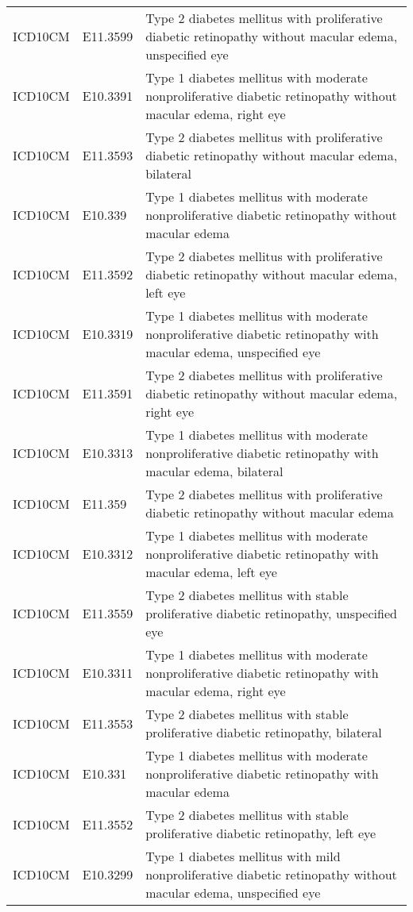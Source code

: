 \begin{table}[ht]
\begin{tabular}{lll}
  ICD10CM & E11.3599 & Type 2 diabetes mellitus with proliferative diabetic retinopathy without macular edema, unspecified eye \\ 
  ICD10CM & E10.3391 & Type 1 diabetes mellitus with moderate nonproliferative diabetic retinopathy without macular edema, right eye \\ 
  ICD10CM & E11.3593 & Type 2 diabetes mellitus with proliferative diabetic retinopathy without macular edema, bilateral \\ 
  ICD10CM & E10.339 & Type 1 diabetes mellitus with moderate nonproliferative diabetic retinopathy without macular edema \\ 
  ICD10CM & E11.3592 & Type 2 diabetes mellitus with proliferative diabetic retinopathy without macular edema, left eye \\ 
  ICD10CM & E10.3319 & Type 1 diabetes mellitus with moderate nonproliferative diabetic retinopathy with macular edema, unspecified eye \\ 
  ICD10CM & E11.3591 & Type 2 diabetes mellitus with proliferative diabetic retinopathy without macular edema, right eye \\ 
  ICD10CM & E10.3313 & Type 1 diabetes mellitus with moderate nonproliferative diabetic retinopathy with macular edema, bilateral \\ 
  ICD10CM & E11.359 & Type 2 diabetes mellitus with proliferative diabetic retinopathy without macular edema \\ 
  ICD10CM & E10.3312 & Type 1 diabetes mellitus with moderate nonproliferative diabetic retinopathy with macular edema, left eye \\ 
  ICD10CM & E11.3559 & Type 2 diabetes mellitus with stable proliferative diabetic retinopathy, unspecified eye \\ 
  ICD10CM & E10.3311 & Type 1 diabetes mellitus with moderate nonproliferative diabetic retinopathy with macular edema, right eye \\ 
  ICD10CM & E11.3553 & Type 2 diabetes mellitus with stable proliferative diabetic retinopathy, bilateral \\ 
  ICD10CM & E10.331 & Type 1 diabetes mellitus with moderate nonproliferative diabetic retinopathy with macular edema \\ 
  ICD10CM & E11.3552 & Type 2 diabetes mellitus with stable proliferative diabetic retinopathy, left eye \\ 
  ICD10CM & E10.3299 & Type 1 diabetes mellitus with mild nonproliferative diabetic retinopathy without macular edema, unspecified eye \\ 

\end{tabular}
\end{table}
